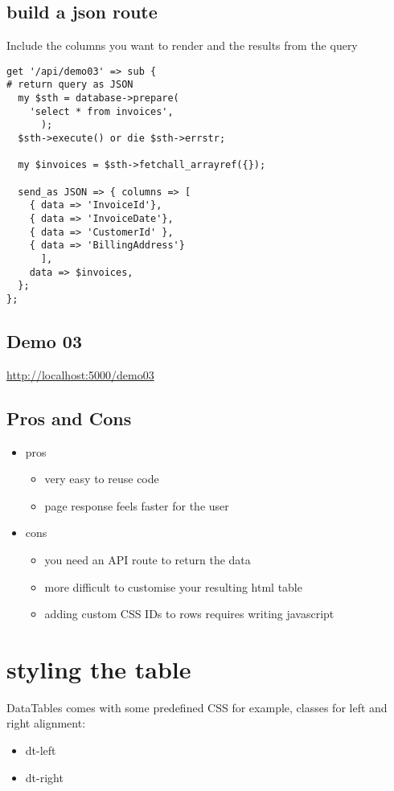 \documentclass[11pt]{article}
\begin{document}
\subsection*{build a json route}
\label{sec:orgheadline20}
Include the columns you want to render and the results from the query
\begin{verbatim}
get '/api/demo03' => sub {
# return query as JSON
  my $sth = database->prepare(
	'select * from invoices',
      );
  $sth->execute() or die $sth->errstr;

  my $invoices = $sth->fetchall_arrayref({});

  send_as JSON => { columns => [
    { data => 'InvoiceId'},
    { data => 'InvoiceDate'},
    { data => 'CustomerId' },
    { data => 'BillingAddress'}
      ],
    data => $invoices,
  };
};
\end{verbatim}
\subsection*{Demo 03}
\label{sec:orgheadline21}
\url{http://localhost:5000/demo03}
\subsection*{Pros and Cons}
\label{sec:orgheadline22}
\begin{itemize}
\item pros
\begin{itemize}
\item very easy to reuse code
\item page response feels faster for the user
\end{itemize}
\item cons
\begin{itemize}
\item you need an API route to return the data
\item more difficult to customise your resulting html table
\item adding custom CSS IDs to rows requires writing javascript
\end{itemize}
\end{itemize}
\section*{styling the table}
\label{sec:orgheadline28}
DataTables comes with some predefined CSS
for example, classes for left and right alignment:
\begin{itemize}
\item dt-left
\item dt-right
\end{itemize}
\end{document}

